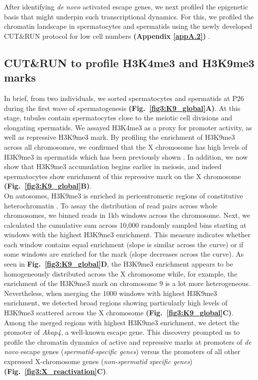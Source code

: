 After identifying \emph{de novo} activated escape genes, we next profiled the epigenetic basis that might underpin such transcriptional dynamics. 
For this, we profiled the chromatin landscape in spermatocytes and spermatids using the newly developed CUT\&{}RUN protocol for low cell numbers \textbf{(Appendix \ref{appA.2})} \citep{Skene2018}. 

\subsection{CUT\&{}RUN to profile H3K4me3 and H3K9me3 marks}

In brief, from two individuals, we sorted spermatocytes and spermatids at P26 during the first wave of spermatogenesis \textbf{(Fig.~\ref{fig3:K9_global}A)}. 
At this stage, tubules contain spermatocytes close to the meiotic cell divisions and elongating spermatids. 
We assayed H3K4me3 as a proxy for promoter activity, as well as repressive H3K9me3 mark. By profiling the enrichment of H3K9me3 across all chromosomes, we confirmed that the X chromosome has high levels of H3K9me3 in spermatids which has been previously shown \citep{Moretti2016, Greaves2006, Tachibana2007}. 
In addition, we now show that H3K9me3 accumulation begins earlier in meiosis, and indeed spermatocytes show enrichment of this repressive mark on the X chromosome \textbf{(Fig.~\ref{fig3:K9_global}B)}. \\

On autosomes, H3K9me3 is enriched in pericentromeric regions of constitutive heterochromatin \citep{Peters2001}. 
To assay the distribution of read pairs across whole chromosomes, we binned reads in 1kb windows across the chromosome. 
Next, we calculated the cumulative sum across 10,000 randomly sampled bins starting at windows with the highest H3K9me3 enrichment. 
This measure indicates whether each window contains equal enrichment (slope is similar across the curve) or if some windows are enriched for the mark (slope decreases across the curve). 
As seen in \textbf{Fig.~\ref{fig3:K9_global}D}, the H3K9me3 enrichment appears to be homogeneously distributed across the X chromosome while, for example, the enrichment of the H3K9me3 mark on chromosome 9 is a lot more heterogeneous. \\

Nevertheless, when merging the 1000 windows with highest H3K9me3 enrichment, we detected broad regions showing particularly high levels of H3K9me3 scattered across the X chromosome \textbf{(Fig.~\ref{fig3:K9_global}C)}. 
Among the merged regions with highest H3K9me3 enrichment, we detect the promoter of \textit{Akap4}, a well-known escape gene. 
This discovery prompted us to profile the chromatin dynamics of active and repressive marks at promoters of \emph{de novo} escape genes (\emph{spermatid-specific genes}) versus the promoters of all other expressed X-chromosome genes (\emph{non-spermatid specific genes}) \textbf{(Fig.~\ref{fig3:X_reactivation}C)}.

